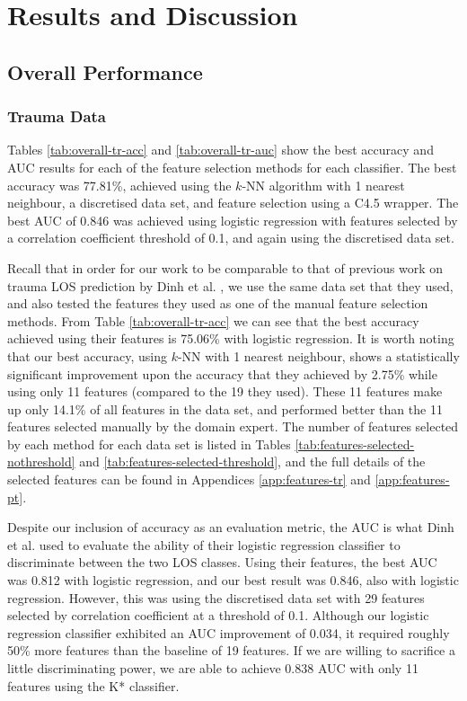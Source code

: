 \chapter{Results and Discussion} \label{chap:results}

\section{Overall Performance}
\subsection{Trauma Data}
Tables \ref{tab:overall-tr-acc} and \ref{tab:overall-tr-auc} show the best
accuracy and AUC results for each of the feature selection methods for each
classifier. The best accuracy was 77.81\%, achieved using the $k$-NN algorithm
with 1 nearest neighbour, a discretised data set, and feature selection using a
C4.5 wrapper. The best AUC of 0.846 was achieved using logistic regression with
features selected by a correlation coefficient threshold of 0.1, and again
using the discretised data set.




Recall that in order for our work to be comparable to that of previous work on
trauma LOS prediction by Dinh et al. \cite{Dinh2013a}, we use the same data set
that they used, and also tested the features they used as one of the manual
feature selection methods. From Table \ref{tab:overall-tr-acc} we can see that
the best accuracy achieved using their features is 75.06\% with logistic
regression. It is worth noting that our best accuracy, using $k$-NN with 1
nearest neighbour, shows a statistically significant improvement upon the accuracy
that they achieved by 2.75\%
while using only 11 features (compared to the 19 they used). These 11 features
make up only 14.1\% of all features in the data set, and performed better than
the 11 features selected manually by the domain expert. The number of features
selected by each method for each data set is listed in Tables
\ref{tab:features-selected-nothreshold} and
\ref{tab:features-selected-threshold}, and the full details of the selected
features can be found in Appendices \ref{app:features-tr} and
\ref{app:features-pt}.

Despite our inclusion of accuracy as an evaluation metric, the AUC is what Dinh
et al. \cite{Dinh2013a}
used to evaluate the ability of their logistic regression classifier to
discriminate between the two LOS classes. Using their features, the best AUC
was 0.812 with logistic regression, and our best result was 0.846, also with
logistic regression. However, this was using the discretised data set with 29
features selected by correlation coefficient at a threshold of 0.1.
Although our logistic regression classifier exhibited an AUC improvement of
0.034, it required roughly 50\% more features than the baseline of 19 features.
If we are willing to sacrifice a little discriminating power, we are able to
achieve 0.838 AUC with only 11 features using the K* classifier.

